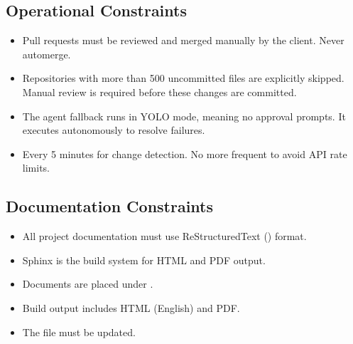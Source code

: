 \documentclass[letterpaper,10pt,openany,oneside,english]{sphinxmanual}
\begin{document}
\subsection{Operational Constraints}
\label{\detokenize{constraints:operational-constraints}}\begin{itemize}
\item {} 
\sphinxAtStartPar
{} \textendash{} Pull requests must be reviewed and merged manually by the client. Never auto\sphinxhyphen{}merge.

\item {} 
\sphinxAtStartPar
{} \textendash{} Repositories with more than 500 uncommitted files are explicitly skipped. Manual review is required before these changes are committed.

\item {} 
\sphinxAtStartPar
{} \textendash{} The agent fallback runs in YOLO mode, meaning no approval prompts. It executes autonomously to resolve failures.

\item {} 
\sphinxAtStartPar
{} \textendash{} Every 5 minutes for change detection. No more frequent to avoid API rate limits.

\end{itemize}


\subsection{Documentation Constraints}
\label{\detokenize{constraints:documentation-constraints}}\begin{itemize}
\item {} 
\sphinxAtStartPar
All project documentation must use ReStructuredText () format.

\item {} 
\sphinxAtStartPar
Sphinx is the build system for HTML and PDF output.

\item {} 
\sphinxAtStartPar
Documents are placed under .

\item {} 
\sphinxAtStartPar
Build output includes HTML (English) and PDF.

\item {} 
\sphinxAtStartPar
The  file must be updated.

\end{itemize}
\end{document}

